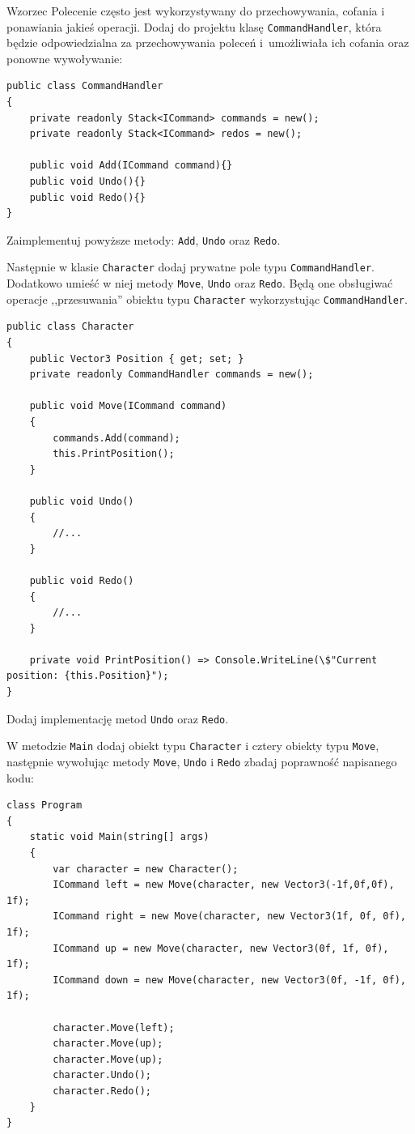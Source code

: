 Wzorzec Polecenie często jest wykorzystywany do przechowywania, cofania i ponawiania jakieś operacji. Dodaj do projektu klasę \texttt{CommandHandler}, która będzie odpowiedzialna za przechowywania poleceń i~umożliwiała ich cofania oraz ponowne wywoływanie:
\begin{lstlisting}
public class CommandHandler
{
	private readonly Stack<ICommand> commands = new();
	private readonly Stack<ICommand> redos = new();
	
	public void Add(ICommand command){}
	public void Undo(){}
	public void Redo(){}
}
\end{lstlisting}
Zaimplementuj powyższe metody: \texttt{Add}, \texttt{Undo} oraz \texttt{Redo}.

Następnie w klasie \texttt{Character} dodaj prywatne pole typu \texttt{CommandHandler}. Dodatkowo umieść w niej metody \texttt{Move}, \texttt{Undo} oraz \texttt{Redo}. Będą one obsługiwać operacje ,,przesuwania'' obiektu typu \texttt{Character} wykorzystując \texttt{CommandHandler}.
\begin{lstlisting}
public class Character
{
	public Vector3 Position { get; set; }
	private readonly CommandHandler commands = new();
	
	public void Move(ICommand command)
	{
		commands.Add(command);
		this.PrintPosition();
	}
	
	public void Undo()
	{
		//...
	}
	
	public void Redo()
	{
		//...
	}
	
	private void PrintPosition() => Console.WriteLine(\$"Current position: {this.Position}");
}
\end{lstlisting}
Dodaj implementację metod \texttt{Undo} oraz \texttt{Redo}.

W metodzie \texttt{Main} dodaj obiekt typu \texttt{Character} i cztery obiekty typu \texttt{Move}, następnie wywołując metody \texttt{Move}, \texttt{Undo} i \texttt{Redo} zbadaj poprawność napisanego kodu:
\begin{lstlisting}
class Program
{
	static void Main(string[] args)
	{
		var character = new Character();
		ICommand left = new Move(character, new Vector3(-1f,0f,0f), 1f);
		ICommand right = new Move(character, new Vector3(1f, 0f, 0f), 1f);
		ICommand up = new Move(character, new Vector3(0f, 1f, 0f), 1f);
		ICommand down = new Move(character, new Vector3(0f, -1f, 0f), 1f);
		
		character.Move(left);
		character.Move(up);
		character.Move(up);
		character.Undo();
		character.Redo();
	}
}
\end{lstlisting}

